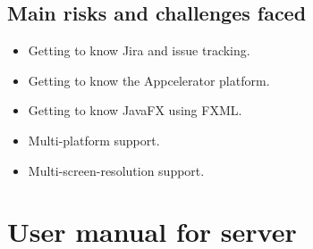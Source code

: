 \documentclass[10pt,a4paper]{article}
\begin{document}
\subsection{Main risks and challenges faced}
\begin{itemize}
\item Getting to know Jira and issue tracking.
\item Getting to know the Appcelerator platform.
\item Getting to know JavaFX using FXML.
\item Multi-platform support.
\item Multi-screen-resolution support.
\end{itemize}
\section{User manual for server}
\end{document}
